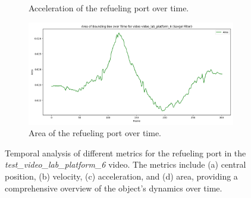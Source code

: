 \documentclass[12pt,oneside]{book} %
\begin{document}
\begin{figure}[H]
\begin{subfigure}[t]{0.6\textwidth}
        \caption{Acceleration of the refueling port over time.}
        \label{fig:acceleration-test-video_lab_platform_6-savgol}
    \end{subfigure}
    \hfill
    \begin{subfigure}[t]{0.6\textwidth}
        \includegraphics[width=\textwidth]{figures/bbox_metrics/video_lab_platform_6 (Savgol Filter)_area.png}
        \caption{Area of the refueling port over time.}
        \label{fig:size-test-video_lab_platform_6-savgol}
    \end{subfigure}
    \caption{Temporal analysis of different metrics for the refueling port in the \textit{test\_video\_lab\_platform\_6} video. The metrics include (a) central position, (b) velocity, (c) acceleration, and (d) area, providing a comprehensive overview of the object's dynamics over time.}
    \label{fig:bbox-metrics-test-video_lab_platform_6-savgol}
\end{figure}




\end{document}
